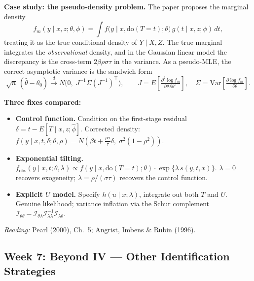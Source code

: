 \documentclass[12pt]{article}
\begin{document}
\medskip
\noindent\textbf{Case study: the pseudo-density problem.}
The paper proposes the marginal density
\[
  f_m(y \mid x, z;\theta,\phi)
  = \int f\!\bigl(y \mid x, \mathrm{do}(T{=}t);\theta\bigr)\,
         g(t \mid x, z;\phi)\, dt,
\]
treating it as the true conditional density of $Y \mid X, Z$.
The true marginal integrates the \emph{observational} density, and in
the Gaussian linear model the discrepancy is the cross-term
$2\beta\rho\sigma\tau$ in the variance.  As a pseudo-MLE, the correct
asymptotic variance is the sandwich form
\[
  \sqrt{n}\,(\hat\theta - \theta_0) \xrightarrow{d}
  N\!\bigl(0,\; J^{-1}\Sigma(J^{-1})^\top\bigr),
  \qquad
  J = E\!\left[\tfrac{\partial^2 \log f_m}{\partial\theta\,\partial\theta^\top}\right],
  \quad
  \Sigma = \mathrm{Var}\!\left[\tfrac{\partial \log f_m}{\partial\theta}\right].
\]

\noindent\textbf{Three fixes compared:}
\begin{itemize}
  \item \textbf{Control function.}  Condition on the first-stage residual
    $\delta = t - E[T \mid x,z;\hat\phi]$.  Corrected density:
    $f(y \mid x, t, \delta;\theta,\rho)
     = N\!\left(\beta t + \tfrac{\rho\sigma}{\tau}\delta,\;
               \sigma^2(1-\rho^2)\right)$.

  \item \textbf{Exponential tilting.}
    $f_{\mathrm{obs}}(y \mid x,t;\theta,\lambda)
     \propto f(y \mid x,\mathrm{do}(T{=}t);\theta)
             \cdot\exp\!\bigl\{\lambda\, s(y,t,x)\bigr\}$.
    $\lambda = 0$ recovers exogeneity; $\lambda = \rho/(\sigma\tau)$
    recovers the control function.

  \item \textbf{Explicit $U$ model.}  Specify $h(u \mid x;\lambda)$,
    integrate out both $T$ and $U$.  Genuine likelihood; variance
    inflation via the Schur complement
    $\mathcal{I}_{\theta\theta}
     - \mathcal{I}_{\theta\lambda}\mathcal{I}_{\lambda\lambda}^{-1}
       \mathcal{I}_{\lambda\theta}$.
\end{itemize}

\noindent\textit{Reading:} Pearl (2000), Ch.~5;
Angrist, Imbens \& Rubin (1996).

\subsection{Week 7: Beyond IV --- Other Identification Strategies}
\end{document}
